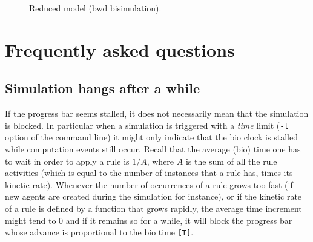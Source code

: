 \documentclass[11pt]{book}
\def\ttt#1{\texttt{#1}}
\begin{document}
\begin{figure}[htp]
\centering\begin{minipage}{0.35\linewidth}
\end{minipage}\caption{Reduced model (bwd bisimulation).}
\end{figure}

\chapter{Frequently asked questions}
\section*{Simulation hangs after a while}
If the progress bar seems stalled, it does not necessarily mean that the simulation is blocked. In particular when a simulation is triggered with a \emph{time} limit (\ttt{-l} option of the command line) it might only indicate that the bio clock is stalled while computation events still occur. Recall that the average (bio) time one has to wait in order to apply a rule is $1/A$, where $A$ is the sum of all the rule activities (which is equal to the number of instances that a rule has, times its kinetic rate). Whenever the number of occurrences of a rule grows too fast (if new agents are created during the simulation for instance), or if the kinetic rate of a rule is defined by a function that grows rapidly, the average time increment might tend to 0 and if it remains so for a while, it will block the progress bar whose advance is proportional to the bio time \ttt{[T]}.
\end{document}
